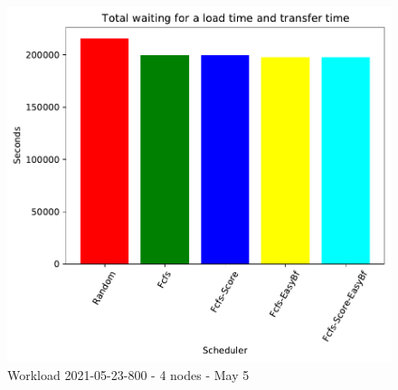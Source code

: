 \documentclass[a4paper]{article}
\begin{document}
\begin{figure}[H]
	\begin{minipage}[b]{0.5\linewidth}\centering\includegraphics[width=1.11\linewidth]{MBSS/plot/2021-05-23-800_Total_waiting_for_a_load_time_and_transfer_time.pdf}\caption{Waiting for a load + Transfer time}\vspace{4ex}\end{minipage}\caption{Workload 2021-05-23-800 - 4 nodes - May 5}\end{figure}
\end{document}
